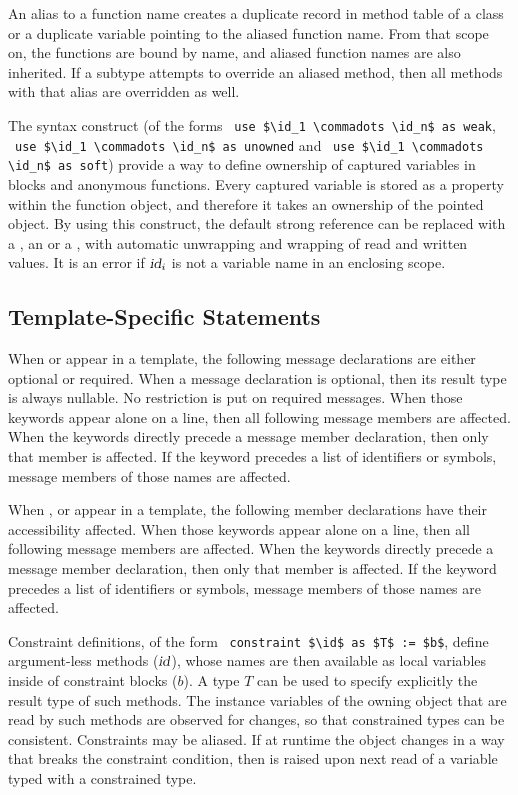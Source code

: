An alias to a function name creates a duplicate record in method table of a class or a duplicate variable pointing to the aliased function name. From that scope on, the functions are bound by name, and aliased function names are also inherited. If a subtype attempts to override an aliased method, then all methods with that alias are overridden as well. 

The  syntax construct (of the forms ~\lstinline{use $\id_1 \commadots \id_n$ as weak}, ~\lstinline{use $\id_1 \commadots \id_n$ as unowned} and ~\lstinline{use $\id_1 \commadots \id_n$ as soft}) provide a way to define ownership of captured variables in blocks and anonymous functions. Every captured variable is stored as a property within the function object, and therefore it takes an ownership of the pointed object. By using this construct, the default strong reference can be replaced with a , an  or a , with automatic unwrapping and wrapping of read and written values. It is an error if $\mbox{\sl id}_i$ is not a variable name in an enclosing scope. 






\subsection{Template-Specific Statements}

When  or  appear in a template, the following message declarations are either optional or required. When a message declaration is optional, then its result type is always nullable. No restriction is put on required messages. When those keywords appear alone on a line, then all following message members are affected. When the keywords directly precede a message member declaration, then only that member is affected. If the keyword precedes a list of identifiers or symbols, message members of those names are affected. 

When ,  or  appear in a template, the following member declarations have their accessibility affected. When those keywords appear alone on a line, then all following message members are affected. When the keywords directly precede a message member declaration, then only that member is affected. If the keyword precedes a list of identifiers or symbols, message members of those names are affected. 

Constraint definitions, of the form ~\lstinline!constraint $\id$ as $T$ := $b$!, define argument-less methods ($\mbox{\sl id}$), whose names are then available as local variables inside of constraint blocks ($b$). A type $T$ can be used to specify explicitly the result type of such methods. The instance variables of the owning object that are read by such methods are observed for changes, so that constrained types can be consistent. Constraints may be aliased. If at runtime the object changes in a way that breaks the constraint condition, then  is raised upon next read of a variable typed with a constrained type. 

